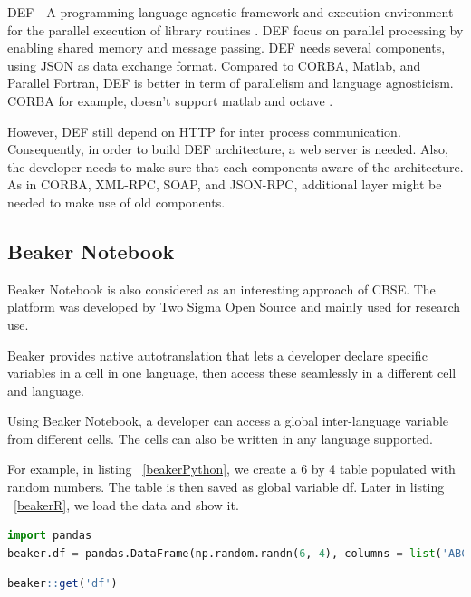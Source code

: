 \documentclass[conference]{IEEEtran}
\begin{document}
DEF - A programming language agnostic framework and execution environment 
for the parallel execution of library routines \cite{feilhauer2016def}. 
DEF focus on parallel processing by enabling shared memory and message passing. 
DEF needs several components, using JSON as data exchange format. 
Compared to CORBA, Matlab, and Parallel Fortran, DEF is better in term of 
parallelism and language agnosticism. CORBA for example, doesn't support matlab and 
octave \cite{feilhauer2016def}. 

However, DEF still depend on HTTP for inter process communication. Consequently, 
in order to build DEF architecture, a web server is needed. Also, the developer needs 
to make sure that each components aware of the architecture. As in CORBA, XML-RPC, 
SOAP, and JSON-RPC, additional layer might be needed to make use of old components.

\subsection{Beaker Notebook}

Beaker Notebook \cite{beakernotebook} is also considered as an interesting 
approach of CBSE. The platform was developed by Two Sigma Open Source and 
mainly used for research use. 

Beaker provides native autotranslation that lets a developer declare specific 
variables in a cell in one language, then access these seamlessly in a 
different cell and language.

Using Beaker Notebook, a developer can access a global inter-language variable
from different cells. The cells can also be written in any language supported.

For example, in listing ~\ref{beakerPython}, we create a 6 by 4 table populated with
random numbers. The table is then saved as global variable df. 
Later in listing ~\ref{beakerR}, we load the data and show it.

\begin{lstlisting}[caption=Beaker Python Cell Example, label=beakerPython, language=python, basicstyle=\small, breaklines=true]
import pandas
beaker.df = pandas.DataFrame(np.random.randn(6, 4), columns = list('ABCD'))
\end{lstlisting}

\begin{lstlisting}[caption=Beaker R Cell Example, label=beakerR, language=R, basicstyle=\small, breaklines=true]
beaker::get('df')
\end{lstlisting}
\end{document}
